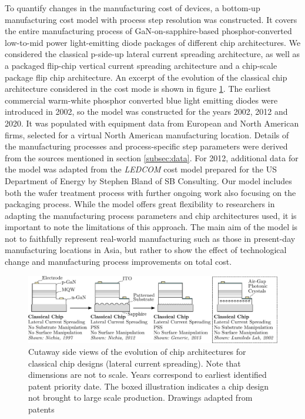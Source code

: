\documentclass[a4paper,nocompress]{spie}  %
\begin{document}
        To quantify changes in the manufacturing cost of devices, a bottom-up manufacturing cost model with process step resolution was constructed. It covers the entire manufacturing process of GaN-on-sapphire-based phosphor-converted low-to-mid power light-emitting diode packages of different chip architectures. We considered the classical p-side-up lateral current spreading architecture, as well as a packaged flip-chip vertical current spreading architecture and a chip-scale package flip chip architecture. An excerpt of the evolution of the classical chip architecture considered in the cost mode is shown in figure \ref{fig:chip_arch}. The earliest commercial warm-white phosphor converted blue light emitting diodes were introduced in 2002, so the model was constructed for the years 2002, 2012 and 2020. It was populated with equipment data from European and North American firms, selected for a virtual North American manufacturing location. Details of the manufacturing processes and process-specific step parameters were derived from the sources mentioned in section \ref{subsec:data}. For 2012, additional data for the model was adapted from the \textit{LEDCOM} cost model prepared for the US Department of Energy by Stephen Bland of SB Consulting\cite{ledcomv2}. Our model includes both the wafer treatment process with further ongoing work also focusing on the packaging process. While the model offers great flexibility to researchers in adapting the manufacturing process parameters and chip architectures used, it is important to note the limitations of this approach. The main aim of the model is not to faithfully represent real-world manufacturing such as those in present-day manufacturing locations in Asia, but rather to show the effect of technological change and manufacturing process improvements on total cost. 

        \begin{figure} [ht]
            \begin{center}
                \includegraphics[width=\textwidth]{SPIE/article/chip_architectures.pdf}
            \end{center}
            \caption{Cutaway side views of the evolution of chip architectures for classical chip designs (lateral current spreading). Note that dimensions are not to scale. Years correspond to earliest identified patent priority date. The boxed illustration indicates a chip design not brought to large scale production. Drawings adapted from patents \cite{nagahama2013nitride,tanaka2010semiconductor,wierer2006photonic}}
            \label{fig:chip_arch}
        \end{figure}
\end{document}
